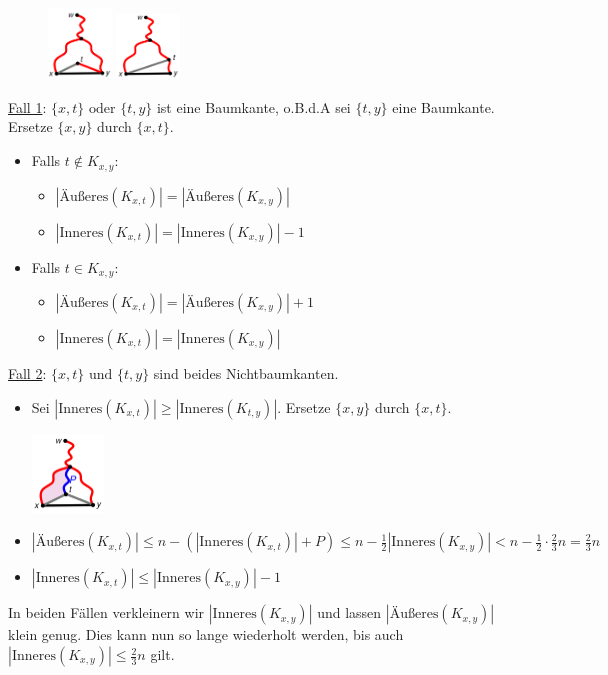\begin{figure}
	\centering
	\vspace{10pt}
	\includegraphics[width=0.15\textwidth]{images/pst-3.png}
	\includegraphics[width=0.15\textwidth]{images/pst-4.png}
	\vspace{40pt}
	\vspace{-800pt}
\end{figure}

\underline{Fall 1}: $\{x,t\}\text{ oder } \{t,y\}$ ist eine Baumkante, o.B.d.A sei $\{t,y\}$ eine Baumkante. Ersetze $\{x,y\}$ durch  $\{x,t\}$.
\begin{itemize}
	\item Falls $t\notin K_{x,y}$:
	\begin{itemize}
		\item $|\text{Äußeres}(K_{x,t})|=|\text{Äußeres}(K_{x,y})|$
		\item $|\text{Inneres}(K_{x,t})|=|\text{Inneres}(K_{x,y})|-1$
	\end{itemize}
	\item Falls $t\in K_{x,y}$:
	\begin{itemize}
		\item $|\text{Äußeres}(K_{x,t})|=|\text{Äußeres}(K_{x,y})|+1$
		\item $|\text{Inneres}(K_{x,t})|=|\text{Inneres}(K_{x,y})|$
	\end{itemize}
\end{itemize}
\bigskip
\underline{Fall 2}: $\{x,t\}\text{ und } \{t,y\}$ sind beides Nichtbaumkanten.
\begin{itemize}
	\item Sei $|\text{Inneres}(K_{x,t})|\geq |\text{Inneres}(K_{t,y})|$. Ersetze $\{x,y\}$ durch  $\{x,t\}$.
	\begin{center}
		\includegraphics[width=0.15\textwidth]{images/pst-5.png}
	\end{center}
	\item $|\text{Äußeres}(K_{x,t})|\leq n-(|\text{Inneres}(K_{x,t})|+P)\leq n-\frac{1}{2}|\text{Inneres}(K_{x,y})|< n-\frac{1}{2}\cdot\frac{2}{3}n=\frac{2}{3}n$
	\item $|\text{Inneres}(K_{x,t})|\leq|\text{Inneres}(K_{x,y})|-1$
\end{itemize}
\bigskip
In beiden Fällen verkleinern wir $|\text{Inneres}(K_{x,y})|$ und lassen $|\text{Äußeres}(K_{x,y})|$ klein genug. Dies kann nun so lange wiederholt werden, bis auch $|\text{Inneres}(K_{x,y})| \leq \frac{2}{3}n$ gilt.

